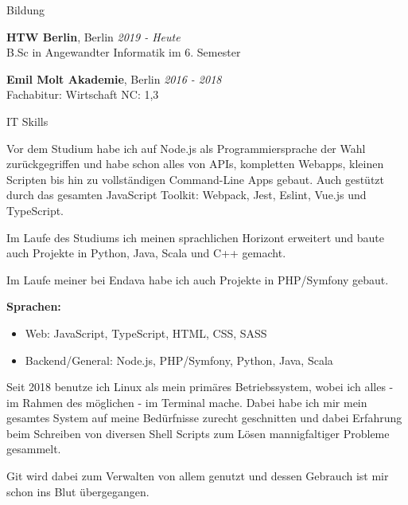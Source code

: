 \documentclass{cv}
\begin{document}
\begin{rSection}{Bildung}

{\bf HTW Berlin}, Berlin \hfill {\em 2019 - Heute}\\
B.Sc in Angewandter Informatik
\hfill im 6. Semester

\smallskip

{\bf Emil Molt Akademie}, Berlin \hfill {\em 2016 - 2018}\\
Fachabitur: Wirtschaft
\hfill NC: 1,3

\end{rSection}

\begin{rSection}{IT Skills}

  \newcommand\skillWidth{0.48}
  \begin{minipage}[t]{\skillWidth\linewidth}

Vor dem Studium habe ich auf Node.js als Programmiersprache der Wahl
zurückgegriffen und habe schon alles von APIs, kompletten Webapps, kleinen
Scripten bis hin zu vollständigen Command-Line Apps gebaut. Auch gestützt durch
das gesamten JavaScript Toolkit: Webpack, Jest, Eslint, Vue.js und TypeScript.

    \medskip

Im Laufe des Studiums ich meinen sprachlichen Horizont erweitert und baute auch
Projekte in Python, Java, Scala und C++ gemacht.

    \medskip

Im Laufe meiner bei Endava habe ich auch Projekte in PHP/Symfony gebaut.

    \medskip

    \textbf{Sprachen:}
    \begin{itemize}
      \item Web: JavaScript, TypeScript, HTML, CSS, SASS
      \item Backend/General: Node.js, PHP/Symfony, Python, Java, Scala
    \end{itemize}
  \end{minipage}
  \hfill
  \begin{minipage}[t]{\skillWidth\linewidth}

Seit 2018 benutze ich Linux als mein primäres Betriebssystem, wobei ich
alles - im Rahmen des möglichen - im Terminal mache. Dabei habe ich mir mein
gesamtes System auf meine Bedürfnisse zurecht geschnitten und dabei Erfahrung
beim Schreiben von diversen Shell Scripts zum Lösen mannigfaltiger Probleme
gesammelt.

Git wird dabei zum Verwalten von allem genutzt und dessen Gebrauch
ist mir schon ins Blut übergegangen.


\end{minipage}
\end{rSection}
\end{document}
